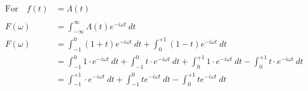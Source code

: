 \documentclass[preview]{standalone}
\begin{document}
\begin{align*}
\textrm{For} \quad f(t)&=\Lambda(t) \\ \\ F(\omega)&=\int_{-\infty}^{\infty}\Lambda(t)e^{-i\omega t} \ dt \\ F(\omega)&=\int_{-1}^{0}(1+t)e^{-i\omega t} \ dt+\int_{0}^{+1}(1-t)e^{-i\omega t} \ dt \\ &=\int_{-1}^{0}1\cdot e^{-i\omega t} \ dt+\int_{-1}^{0}t\cdot e^{-i\omega t} \ dt+\int_{0}^{+1}1\cdot e^{-i\omega t} \ dt-\int_{0}^{+1}t\cdot e^{-i\omega t} \ dt \\ &=\int_{-1}^{+1}\cdot e^{-i\omega t} \ dt+\int_{-1}^{0}t e^{-i\omega t} \ dt-\int_{0}^{+1}t e^{-i\omega t} \ dt
\end{align*}
\end{document}
